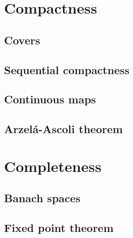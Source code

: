 \documentclass[../Year2.tex]{subfiles}
\begin{document}
\section{Compactness}

\subsection{Covers}

\subsection{Sequential compactness}

\subsection{Continuous maps}

\subsection{Arzelá-Ascoli theorem}

\section{Completeness}

\subsection{Banach spaces}

\subsection{Fixed point theorem}
\end{document}
